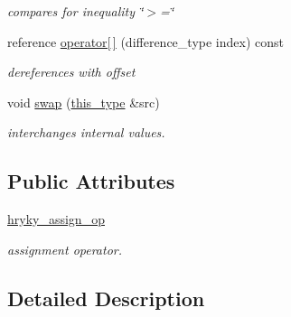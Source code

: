 \begin{DoxyCompactItemize}
\begin{DoxyCompactList}\small\item\em compares for inequality \char`\"{}$>$=\char`\"{} \end{DoxyCompactList}\item 
\hypertarget{classhryky_1_1iterator_1_1random_1_1_base_a6988b0fcaf2cd0113ff4ae48de9aafb9}{reference \hyperlink{classhryky_1_1iterator_1_1random_1_1_base_a6988b0fcaf2cd0113ff4ae48de9aafb9}{operator\mbox{[}$\,$\mbox{]}} (difference\-\_\-type index) const }\label{classhryky_1_1iterator_1_1random_1_1_base_a6988b0fcaf2cd0113ff4ae48de9aafb9}

\begin{DoxyCompactList}\small\item\em dereferences with offset \end{DoxyCompactList}\item 
\hypertarget{classhryky_1_1iterator_1_1random_1_1_base_acc5694bc21edc91c97d8b55d80b6f110}{void \hyperlink{classhryky_1_1iterator_1_1random_1_1_base_acc5694bc21edc91c97d8b55d80b6f110}{swap} (\hyperlink{classhryky_1_1iterator_1_1random_1_1_base}{this\-\_\-type} \&src)}\label{classhryky_1_1iterator_1_1random_1_1_base_acc5694bc21edc91c97d8b55d80b6f110}

\begin{DoxyCompactList}\small\item\em interchanges internal values. \end{DoxyCompactList}\end{DoxyCompactItemize}
\subsection*{Public Attributes}
\begin{DoxyCompactItemize}
\item 
\hypertarget{classhryky_1_1iterator_1_1random_1_1_base_a3fc3be5c70c5f2e46d4494c3dbf40598}{\hyperlink{classhryky_1_1iterator_1_1random_1_1_base_a3fc3be5c70c5f2e46d4494c3dbf40598}{hryky\-\_\-assign\-\_\-op}}\label{classhryky_1_1iterator_1_1random_1_1_base_a3fc3be5c70c5f2e46d4494c3dbf40598}

\begin{DoxyCompactList}\small\item\em assignment operator. \end{DoxyCompactList}\end{DoxyCompactItemize}


\subsection{Detailed Description}
